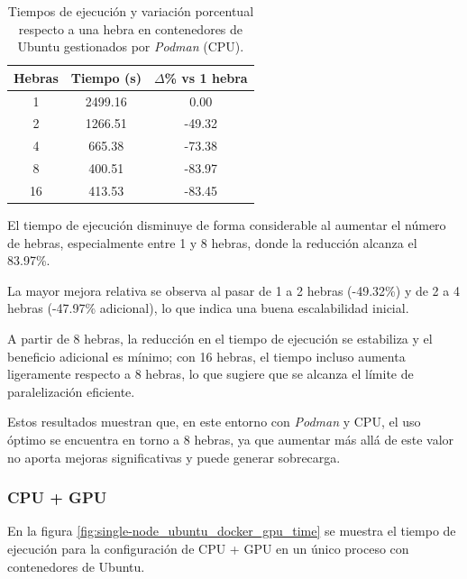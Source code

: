 \begin{table}[ht]
    \centering
    \begin{tabular}{|c|c|c|}
        \hline
        \textbf{Hebras} & \textbf{Tiempo (s)} & \textbf{$\Delta$\% vs 1 hebra} \\
        \hline
        1               & 2499.16             & 0.00                           \\
        2               & 1266.51             & -49.32                         \\
        4               & 665.38              & -73.38                         \\
        8               & 400.51              & -83.97                         \\
        16              & 413.53              & -83.45                         \\
        \hline
    \end{tabular}
    \caption{Tiempos de ejecución y variación porcentual respecto a una hebra en contenedores de Ubuntu gestionados por \textit{Podman} (CPU).}
    \label{tab:single-node_ubuntu_podman}
\end{table}

El tiempo de ejecución disminuye de forma considerable al aumentar el número de hebras, especialmente entre 1 y 8 hebras, donde la reducción alcanza el 83.97\%.

La mayor mejora relativa se observa al pasar de 1 a 2 hebras (-49.32\%) y de 2 a 4 hebras (-47.97\% adicional), lo que indica una buena escalabilidad inicial.

A partir de 8 hebras, la reducción en el tiempo de ejecución se estabiliza y el beneficio adicional es mínimo; con 16 hebras, el tiempo incluso aumenta ligeramente respecto a 8 hebras, lo que sugiere que se alcanza el límite de paralelización eficiente.

Estos resultados muestran que, en este entorno con \textit{Podman} y CPU, el uso óptimo se encuentra en torno a 8 hebras, ya que aumentar más allá de este valor no aporta mejoras significativas y puede generar sobrecarga.

\subsubsection{CPU + GPU}

En la figura \ref{fig:single-node_ubuntu_docker_gpu_time} se muestra el tiempo de ejecución para la configuración de CPU + GPU en un único proceso con contenedores de Ubuntu.

